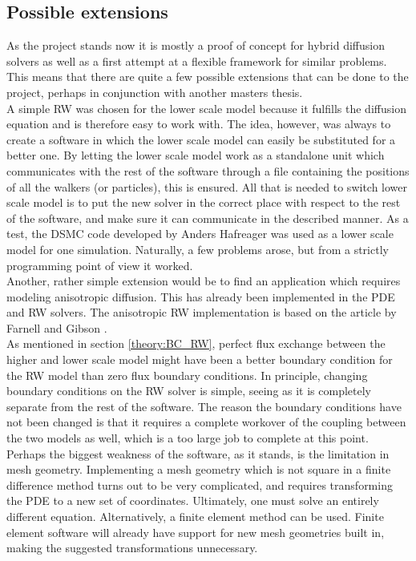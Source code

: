 \subsection{Possible extensions}
As the project stands now it is mostly a proof of concept for hybrid diffusion solvers as well as a first attempt at a flexible framework for similar problems. 
This means that there are quite a few possible extensions that can be done to the project, perhaps in conjunction with another masters thesis. \\

\noindent A simple RW was chosen for the lower scale model because it fulfills the diffusion equation and is therefore easy to work with. 
The idea, however, was always to create a software in which the lower scale model can easily be substituted for a better one. 
By letting the lower scale model work as a standalone unit which communicates with the rest of the software through a file containing the positions of all the walkers (or particles), this is ensured. 
All that is needed to switch lower scale model is to put the new solver in the correct place with respect to the rest of the software, and make sure it can communicate in the described manner. 
As a test, the DSMC code developed by Anders Hafreager \cite{hafreager2014flow} was used as a lower scale model for one simulation. 
Naturally, a few problems arose, but from a strictly programming point of view it worked. \\

\noindent Another, rather simple extension would be to find an application which requires modeling anisotropic diffusion. This has already been implemented in the PDE and RW solvers. The anisotropic RW implementation is based on the article by Farnell and Gibson \cite{farnell2005monte}. \\

\noindent As mentioned in section \ref{theory:BC_RW}, perfect flux exchange between the higher and lower scale model might have been a better boundary condition for the RW model than zero flux boundary conditions. 
In principle, changing boundary conditions on the RW solver is simple, seeing as it is completely separate from the rest of the software. 
The reason the boundary conditions have not been changed is that it requires a complete workover of the coupling between the two models as well, which is a too large job to complete at this point. \\

\noindent Perhaps the biggest weakness of the software, as it stands, is the limitation in mesh geometry. 
Implementing a mesh geometry which is not square in a finite difference method turns out to be very complicated, and requires transforming the PDE to a new set of coordinates. 
Ultimately, one must solve an entirely different equation. 
Alternatively, a finite element method can be used. 
Finite element software will already have support for new mesh geometries built in, making the suggested transformations unnecessary. 

